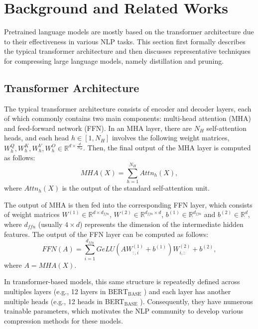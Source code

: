 \section{Background and Related Works}
\label{sec:related}
Pretrained language models \cite{BERT,Roberta,GPT} are mostly based on the transformer architecture \cite{Vaswani2017} due to their effectiveness in various NLP tasks. This section first formally describes the typical transformer architecture and then discusses representative techniques for compressing large language models, namely distillation and pruning.


\subsection{Transformer Architecture}
The typical transformer architecture consists of encoder and decoder layers, each of which commonly contains two main components: multi-head attention (MHA) and feed-forward network (FFN). In an MHA layer, there are $N_H$ self-attention heads, and each head $h \in [1, N_H]$ involves the following weight matrices, $W_{h}^{Q}, W_{h}^{K}, W_{h}^{V}, W_{h}^{O} \in \mathbb{R}^{{d} \times\frac{d}{N_H}}$. Then, the final output of the MHA layer is computed as follows:
$$
MHA(X)= \sum_{h = 1}^{N_{H}} Attn_{h}(X),
$$
where $Attn_{h}(X)$ is the output of the standard self-attention unit.

The output of MHA is then fed into the corresponding FFN layer, which consists of weight matrices $W^{(1)}\in \mathbb{R}^{d \times d_{ffn}}$, $W^{(2)}\in \mathbb{R}^{d_{ffn} \times d}$, $b^{(1)}\in \mathbb{R}^{d_{ffn}}$ and $b^{(2)}\in \mathbb{R}^{d}$, where $d_{ffn}$ (usually $4\times d$) represents the dimension of the
intermediate hidden features. The output of the FFN layer can be computed as follows:
$$
FFN(A)=\sum_{i=1}^{d_{ffn}}GeLU(AW^{(1)}_{:,i}+b^{(1)})W^{(2)}_{i,:}+b^{(2)},
$$
where $A = MHA(X)$.

In transformer-based models, this same structure is repeatedly defined across multiples layers (e.g., 12 layers in $\text{BERT}_{\text{BASE}}$ \cite{BERT}) and each layer has another multiple heads (e.g., 12 heads in BERT$_{\text{BASE}}$ \cite{BERT}). Consequently, they have numerous trainable parameters, which motivates the NLP community to develop various compression methods for these models.


